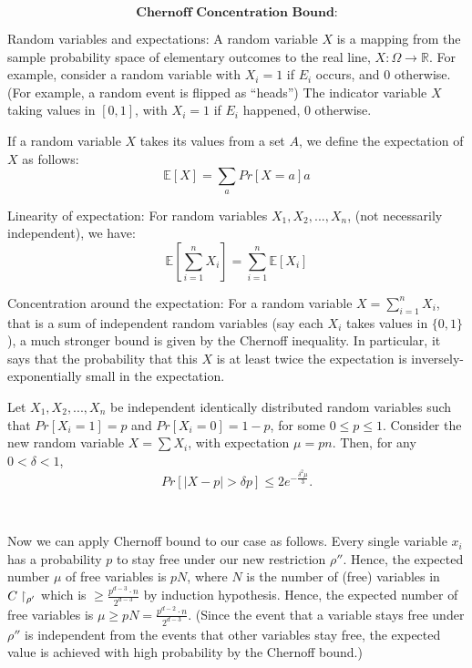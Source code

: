 \begin{tcolorbox}[colframe=white, colback=gray!11, boxrule=0mm, sharp corners]

\[
\textbf{Chernoff Concentration Bound:}
\]

Random variables and expectations: A random variable \( X \) is a mapping from the sample probability space of elementary outcomes to the real line, \( X: \Omega \to \mathbb{R} \). For example, consider a random variable with \( X_i = 1 \) if \( E_i \) occurs, and \( 0 \) otherwise. (For example, a random event is flipped as ``heads'') The indicator variable \( X \) taking values in \( [0, 1] \), with \( X_i = 1 \) if \( E_i \) happened, \( 0 \) otherwise.

If a random variable \( X \) takes its values from a set \( A \), we define the expectation of \( X \) as follows:
\[
\mathbb{E}[X] = \sum_a Pr[X = a]a
\]

Linearity of expectation: For random variables \( X_1, X_2, ..., X_n \), (not necessarily independent), we have:
\[
\mathbb{E} \left[ \sum_{i=1}^{n} X_i \right] = \sum_{i=1}^{n} \mathbb{E}[X_i]
\]

Concentration around the expectation: 
For a random variable \( X = \sum^n_{i=1} X_i \), that is a sum of independent random variables (say each \( X_i \) takes values in \( \{0, 1\} \)), a much stronger bound is given by the Chernoff inequality. In particular, it says that the probability that this \( X \) is at least twice the expectation is inversely-exponentially small in the expectation.

\begin{theorem} Let \( X_1, X_2, ..., X_n \) be independent identically distributed random variables such that \( Pr[X_i = 1] = p \) and \( Pr[X_i = 0] = 1 - p \), for some \( 0 \leq p \leq 1 \).
Consider the new random variable \( X = \sum X_i \), with expectation \( \mu = pn \). Then, for any \( 0 < \delta < 1 \),
\[
Pr[|X - p| > \delta p] \leq 2 e^{- \frac{\delta^2 \mu}{3}}.
\]
\end{theorem}
\end{tcolorbox}



\
\

Now we can apply Chernoff bound to our case as follows.
Every single variable \( x_i \) has a probability \( p \) to stay free under our new restriction  \( \rho'' \).
Hence, the expected number $\mu$ of free variables is \( pN \), where $N$ is the number of (free) variables in $C\upharpoonright_{\rho'}$ which is $\ge \frac{p^{d-3} \cdot n}{2^{d-3}}$ by induction hypothesis. Hence, the expected number of free variables is $\mu\ge pN= \frac{p^{d-2} \cdot n}{2^{d-3}}$. 
(Since the event that a variable stays free under \( \rho'' \) is independent from the events that other variables stay free, the expected value is achieved with high probability by the Chernoff bound.)

